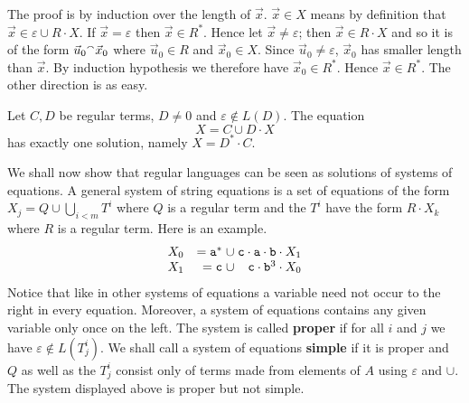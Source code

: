 \proofbeg
The proof is by
induction over the length of $\vec{x}$. $\vec{x} \in X$ means by
definition that $\vec{x} \in \varepsilon \cup R \cdot X$.
If $\vec{x} = \varepsilon$ then $\vec{x} \in R^{\ast}$.
Hence let $\vec{x} \neq \varepsilon$; then $\vec{x} \in R
\cdot X$ and so it is of the form $\vec{u}_0 {^{\smallfrown}} \vec{x}_0$
where $\vec{u}_0 \in R$ and $\vec{x}_0 \in X$.  Since
$\vec{u}_0 \neq \varepsilon$, $\vec{x}_0$ has smaller length
than $\vec{x}$. By induction hypothesis we therefore have
$\vec{x}_0 \in R^{\ast}$. Hence $\vec{x} \in R^{\ast}$. The
other direction is as easy.
\proofend
\begin{lem}
\label{lem:regsolution}
Let $C, D$ be regular terms, $D \neq 0$ and $\varepsilon \not\in L(D)$.
The equation 
\begin{equation}
X = C \cup D \cdot X
\end{equation}
has exactly one solution, namely $X = D^{\ast} \cdot C$.
\proofend
\end{lem}
We shall now show that regular languages can be seen as solutions
of systems of equations. A general system of string equations is a 
set of equations of the form $X_j = Q \cup \bigcup_{i < m} T^i$ where 
$Q$ is a regular term and the $T^i$ have the form $R \cdot X_k$ where
$R$ is a regular term. Here is an example.
\begin{equation}
\begin{array}{lr@{\; \cup\; }r}
X_0 & = \mbox{\tt a}^{\ast} & \mbox{\tt c} \cdot
    \mbox{\tt a} \cdot \mbox{\tt b} \cdot X_1   \\
X_1 & = \mbox{\tt c}        & \mbox{\tt c}
    \cdot \mbox{\tt b}^3 \cdot X_0
\end{array}
\end{equation}
Notice that like in other systems of equations a variable
need not occur to the right in every equation. Moreover,
a system of equations contains any given variable only once
on the left. The system is called \textbf{proper} if for all
$i$ and $j$ we have $\varepsilon \not\in L(T^i_j)$. We shall call
a system of equations \textbf{simple} if it is proper and $Q$ as well
as the $T^i_j$ consist only of terms made from elements of
$A$ using $\varepsilon$ and $\cup$.
The system displayed above is proper but not simple.

